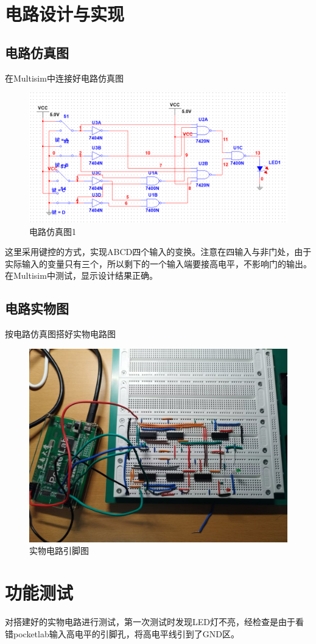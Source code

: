 \documentclass{ctexart}
\begin{document}
\section{电路设计与实现}
\subsection{电路仿真图}
在Multisim中连接好电路仿真图
\begin{figure}[H]
    \centering
    \includegraphics[width=0.75\linewidth]{fig/电路仿真图1.png}
    \caption{电路仿真图1}
    \label{电路仿真图1}
\end{figure}
这里采用键控的方式，实现ABCD四个输入的变换。注意在四输入与非门处，由于实际输入的变量只有三个，所以剩下的一个输入端要接高电平，不影响门的输出。在Multisim中测试，显示设计结果正确。
\subsection{电路实物图}
按电路仿真图搭好实物电路图
\begin{figure}[H]
    \centering
    \includegraphics[width=0.75\linewidth]{fig/实物电路图5.jpg}
    \caption{实物电路引脚图}
    \label{实物电路引脚图}
\end{figure}
\section{功能测试}
对搭建好的实物电路进行测试，第一次测试时发现LED灯不亮，经检查是由于看错pocketlab输入高电平的引脚孔，将高电平线引到了GND区。
\end{document}
